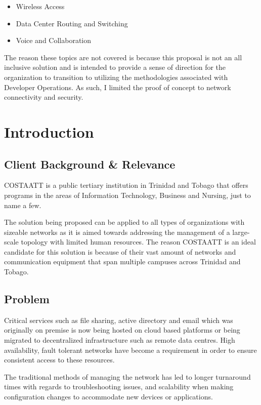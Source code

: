 \documentclass[12pt, letterpaper]{article}
\begin{document}
\begin{itemize}
\item Wireless Access
\item Data Center Routing and Switching
\item Voice and Collaboration
\end{itemize}

The reason these topics are not covered is because this proposal is not an all inclusive solution and is intended to provide a sense of direction for the organization to transition to utilizing the methodologies associated with Developer Operations. As such, I limited the proof of concept to network connectivity and security. 

	
	
\newpage
\section{Introduction}

	\subsection{Client Background \& Relevance}
COSTAATT is a public tertiary institution in Trinidad and Tobago that offers programs in the areas of Information Technology, Business and Nursing, just to name a few.
	
\smallskip

The solution being proposed can be applied to all types of organizations with sizeable
networks as it is aimed towards addressing the management of a large-scale topology with limited human resources. The reason COSTAATT is an ideal candidate for this solution is because of their vast amount of networks and communication equipment that span multiple campuses across Trinidad and Tobago. 

	\subsection{Problem}
Critical services such as file sharing, active directory and email which was originally on premise is now being hosted on cloud based platforms or being migrated to decentralized infrastructure such as remote data centres. High availability, fault tolerant networks have become a requirement in order to ensure consistent access to these resources.

\smallskip

The traditional methods of managing the network has led to longer turnaround times with regards to troubleshooting issues, and scalability when making configuration changes to accommodate new devices or applications.
\end{document}
